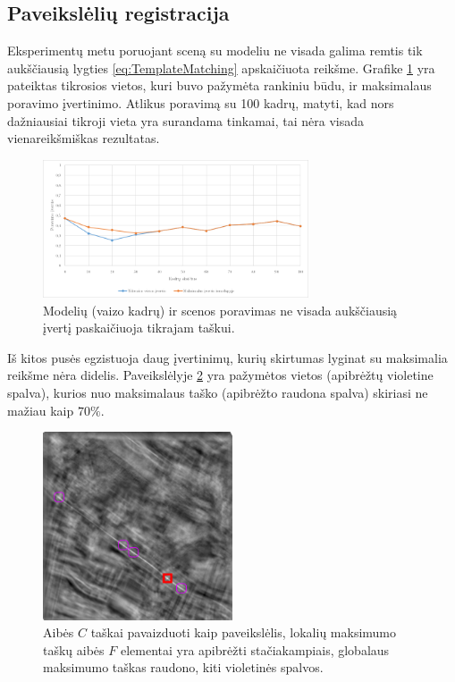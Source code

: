 \documentclass[a4paper,12pt]{article}
\begin{document}
		\subsection{Paveikslėlių registracija}
		
			Eksperimentų metu poruojant sceną su modeliu ne visada galima remtis tik aukščiausią lygties \ref{eq:TemplateMatching} apskaičiuota reikšme. Grafike \ref{fig:MatchesComparison} yra pateiktas tikrosios vietos, kuri buvo pažymėta rankiniu būdu, ir maksimalaus poravimo įvertinimo. Atlikus poravimą su 100 kadrų, matyti, kad nors dažniausiai tikroji vieta yra surandama tinkamai, tai nėra visada vienareikšmiškas rezultatas.
			\begin{figure}[h]
				\centering
				\includegraphics[width=0.7\textwidth]{images/MatchesComparison.png}
				\caption{Modelių (vaizo kadrų) ir scenos poravimas ne visada aukščiausią įvertį paskaičiuoja tikrajam taškui.}
				\label{fig:MatchesComparison}
			\end{figure}
			
			Iš kitos pusės egzistuoja daug įvertinimų, kurių skirtumas lyginat su maksimalia reikšme nėra didelis. Paveikslėlyje \ref{fig:TemplateMatchesRaw} yra pažymėtos vietos (apibrėžtų violetine spalva), kurios nuo maksimalaus taško (apibrėžto raudona spalva) skiriasi ne mažiau kaip $70\%$.
		
			\begin{figure}[h]
				\centering
				\includegraphics[width=0.5\textwidth]{images/matches.png}
				\caption{ Aibės $C$ taškai pavaizduoti kaip paveikslėlis, lokalių maksimumo taškų aibės $F$ elementai yra apibrėžti stačiakampiais, globalaus maksimumo taškas raudono, kiti violetinės spalvos.}
				\label{fig:TemplateMatchesRaw}
			\end{figure}
			
\end{document}
